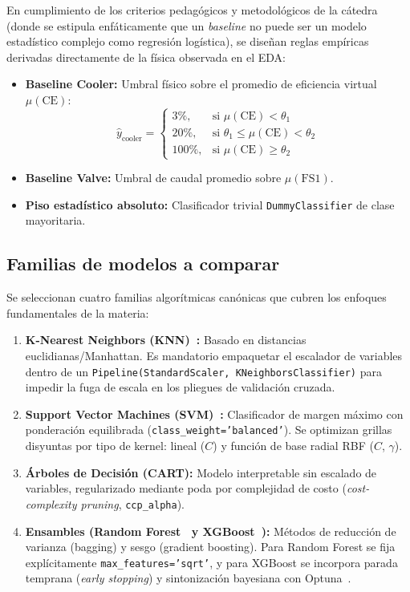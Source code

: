 \documentclass[journal]{IEEEtran}
\begin{document}
En cumplimiento de los criterios pedagógicos y metodológicos de la cátedra (donde se estipula enfáticamente que un \emph{baseline} no puede ser un modelo estadístico complejo como regresión logística), se diseñan reglas empíricas derivadas directamente de la física observada en el EDA:
\begin{itemize}[leftmargin=*]
    \item \textbf{Baseline Cooler:} Umbral físico sobre el promedio de eficiencia virtual $\mu(\text{CE})$:
    \begin{equation}
        \hat{y}_{\text{cooler}} = \begin{cases} 
            3\%, & \text{si } \mu(\text{CE}) < \theta_1 \\ 
            20\%, & \text{si } \theta_1 \le \mu(\text{CE}) < \theta_2 \\ 
            100\%, & \text{si } \mu(\text{CE}) \ge \theta_2 
        \end{cases}
    \end{equation}
    \item \textbf{Baseline Valve:} Umbral de caudal promedio sobre $\mu(\text{FS1})$.
    \item \textbf{Piso estadístico absoluto:} Clasificador trivial \texttt{DummyClassifier} de clase mayoritaria.
\end{itemize}

\subsection{Familias de modelos a comparar}

Se seleccionan cuatro familias algorítmicas canónicas que cubren los enfoques fundamentales de la materia:
\begin{enumerate}[leftmargin=*]
    \item \textbf{K-Nearest Neighbors (KNN)~\cite{Cover1967}:} Basado en distancias euclidianas/Manhattan. Es mandatorio empaquetar el escalador de variables dentro de un \texttt{Pipeline(StandardScaler, KNeighborsClassifier)} para impedir la fuga de escala en los pliegues de validación cruzada.
    \item \textbf{Support Vector Machines (SVM)~\cite{Cortes1995}:} Clasificador de margen máximo con ponderación equilibrada (\texttt{class\_weight='balanced'}). Se optimizan grillas disyuntas por tipo de kernel: lineal ($C$) y función de base radial RBF ($C$, $\gamma$).
    \item \textbf{Árboles de Decisión (CART):} Modelo interpretable sin escalado de variables, regularizado mediante poda por complejidad de costo (\emph{cost-complexity pruning}, \texttt{ccp\_alpha}).
    \item \textbf{Ensambles (Random Forest~\cite{Breiman2001} y XGBoost~\cite{ChenGuestrin2016}):} Métodos de reducción de varianza (bagging) y sesgo (gradient boosting). Para Random Forest se fija explícitamente \texttt{max\_features='sqrt'}, y para XGBoost se incorpora parada temprana (\emph{early stopping}) y sintonización bayesiana con Optuna~\cite{Akiba2019}.
\end{enumerate}
\end{document}
